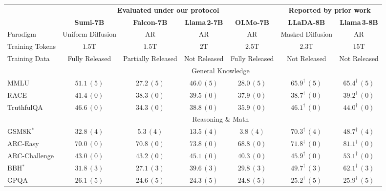 



\begin{tabular}{l cccc|cc}
\toprule
& \multicolumn{4}{c}{\textbf{Evaluated under our protocol}}
  & \multicolumn{2}{c}{\textbf{Reported by prior work}} \\
\cmidrule(lr){2-5} \cmidrule(lr){6-7}
 & \textbf{Sumi-7B} & \textbf{Falcon-7B} & \textbf{Llama\,2-7B} & \textbf{OLMo-7B} & \textbf{LLaDA-8B} & \textbf{Llama\,3-8B} \\
\cmidrule(lr){2-2}\cmidrule(lr){3-3}\cmidrule(lr){4-4}\cmidrule(lr){5-5}\cmidrule(lr){6-6}\cmidrule(lr){7-7}
Paradigm        & Uniform Diffusion & AR     & AR   & AR     & Masked Diffusion & AR \\
Training Tokens & $1.5$T            & $1.5$T & $2$T & $2.5$T & $2.3$T & $15$T \\
Training Data   & Fully Released        & Partially Released & Not Released & Fully Released & Not Released & Not Released \\
\midrule
 & \multicolumn{6}{c}{General Knowledge} \\
\cmidrule(lr){2-7}
MMLU       & $\mathbf{51.1}\,(5)$ & $27.2\,(5)$ & $46.0\,(5)$ & $28.0\,(5)$ & $65.9^{\dagger}\,(5)$ & $65.4^{\dagger}\,(5)$ \\
RACE       & $\mathbf{41.4}\,(0)$ & $38.3\,(0)$ & $39.5\,(0)$ & $37.9\,(0)$ & $38.7^{\ddagger}\,(0)$ & $39.2^{\ddagger}\,(0)$ \\
TruthfulQA & $\mathbf{46.6}\,(0)$ & $34.3\,(0)$ & $38.8\,(0)$ & $35.9\,(0)$ & $46.1^{\dagger}\,(0)$ & $44.0^{\dagger}\,(0)$ \\
\midrule
 & \multicolumn{6}{c}{Reasoning \& Math} \\
\cmidrule(lr){2-7}
GSM8K$^{*}$   & $\mathbf{32.8}\,(4)$ & $5.3\,(4)$  & $13.5\,(4)$ & $3.8\,(4)$  & $70.3^{\dagger}\,(4)$ & $48.7^{\dagger}\,(4)$ \\
ARC-Easy      & $70.0\,(0)$ & $70.8\,(0)$ & $\mathbf{73.8}\,(0)$ & $68.8\,(0)$ & $71.8^{\ddagger}\,(0)$ & $81.1^{\ddagger}\,(0)$ \\
ARC-Challenge & $43.0\,(0)$ & $43.2\,(0)$ & $\mathbf{45.1}\,(0)$ & $40.3\,(0)$ & $45.9^{\dagger}\,(0)$ & $53.1^{\dagger}\,(0)$ \\
BBH$^{*}$     & $31.8\,(3)$ & $27.1\,(3)$ & $\mathbf{39.6}\,(3)$ & $29.8\,(3)$ & $49.7^{\dagger}\,(3)$ & $62.1^{\dagger}\,(3)$ \\
GPQA          & $\mathbf{26.1}\,(5)$ & $24.6\,(5)$ & $24.3\,(5)$ & $24.8\,(5)$ & $25.2^{\dagger}\,(5)$ & $25.9^{\dagger}\,(5)$ \\

\end{tabular}
